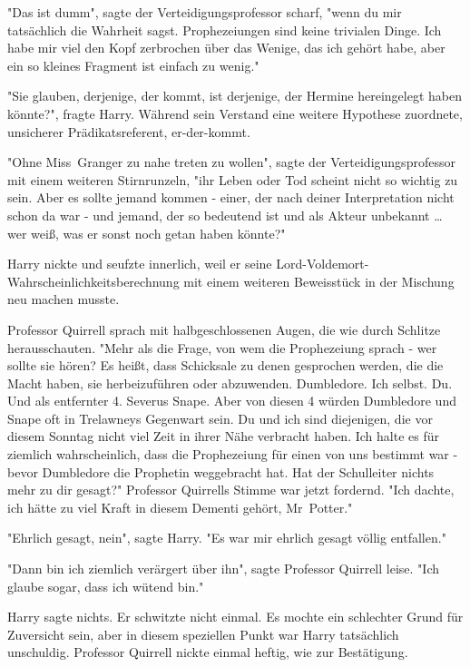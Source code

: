 {"Das ist dumm", sagte der Verteidigungsprofessor scharf, "wenn du mir tatsächlich die Wahrheit sagst. Prophezeiungen sind keine trivialen Dinge. Ich habe mir viel den Kopf zerbrochen über das Wenige, das ich gehört habe, aber ein so kleines Fragment ist einfach zu wenig."

"Sie glauben, derjenige, der kommt, ist derjenige, der Hermine hereingelegt haben könnte?", fragte Harry. Während sein Verstand eine weitere Hypothese zuordnete, unsicherer Prädikatsreferent, er-der-kommt.

"Ohne Miss~Granger zu nahe treten zu wollen", sagte der Verteidigungsprofessor mit einem weiteren Stirnrunzeln, "ihr Leben oder Tod scheint nicht so wichtig zu sein. Aber es sollte jemand kommen - einer, der nach deiner Interpretation nicht schon da war - und jemand, der so bedeutend ist und als Akteur unbekannt … wer weiß, was er sonst noch getan haben könnte?"

Harry nickte und seufzte innerlich, weil er seine Lord-Voldemort-Wahrscheinlichkeitsberechnung mit einem weiteren Beweisstück in der Mischung neu machen musste.

Professor Quirrell sprach mit halbgeschlossenen Augen, die wie durch Schlitze herausschauten. "Mehr als die Frage, von wem die Prophezeiung sprach - wer sollte sie hören? Es heißt, dass Schicksale zu denen gesprochen werden, die die Macht haben, sie herbeizuführen oder abzuwenden. Dumbledore. Ich selbst. Du. Und als entfernter 4. Severus Snape. Aber von diesen 4 würden Dumbledore und Snape oft in Trelawneys Gegenwart sein. Du und ich sind diejenigen, die vor diesem Sonntag nicht viel Zeit in ihrer Nähe verbracht haben. Ich halte es für ziemlich wahrscheinlich, dass die Prophezeiung für einen von uns bestimmt war - bevor Dumbledore die Prophetin weggebracht hat. Hat der Schulleiter nichts mehr zu dir gesagt?" Professor Quirrells Stimme war jetzt fordernd. "Ich dachte, ich hätte zu viel Kraft in diesem Dementi gehört, Mr~Potter."

"Ehrlich gesagt, nein", sagte Harry. "Es war mir ehrlich gesagt völlig entfallen."

"Dann bin ich ziemlich verärgert über ihn", sagte Professor Quirrell leise. "Ich glaube sogar, dass ich wütend bin."

Harry sagte nichts. Er schwitzte nicht einmal. Es mochte ein schlechter Grund für Zuversicht sein, aber in diesem speziellen Punkt war Harry tatsächlich unschuldig. Professor Quirrell nickte einmal heftig, wie zur Bestätigung.

}
